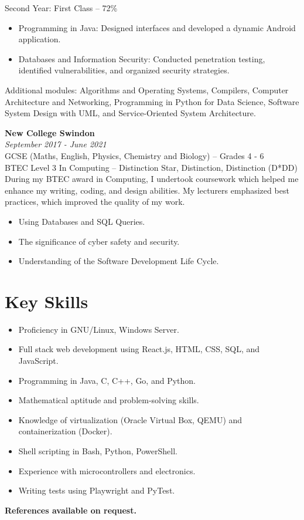 \documentclass[a4paper,12pt]{article}
\begin{document}
Second Year: First Class – 72\% \\
\begin{itemize}[left=0pt,labelsep=5pt]
    \item Programming in Java: Designed interfaces and developed a dynamic Android application.
    \item Databases and Information Security: Conducted penetration testing, identified vulnerabilities, and organized security strategies.
\end{itemize}
Additional modules: Algorithms and Operating Systems, Compilers, Computer Architecture and Networking, Programming in Python for Data Science, Software System Design with UML, and Service-Oriented System Architecture. \\

\vspace{0.3cm}

\textbf{New College Swindon} \\
\textit{September 2017 - June 2021} \\
GCSE (Maths, English, Physics, Chemistry and Biology) – Grades 4 - 6 \\
BTEC Level 3 In Computing – Distinction Star, Distinction, Distinction (D*DD) \\
During my BTEC award in Computing, I undertook coursework which helped me enhance my writing, coding, and design abilities. My lecturers emphasized best practices, which improved the quality of my work.

\begin{itemize}[left=0pt,labelsep=5pt]
    \item Using Databases and SQL Queries.
    \item The significance of cyber safety and security.
    \item Understanding of the Software Development Life Cycle.
\end{itemize}

\vspace{0.5cm}

\section*{Key Skills}
\begin{itemize}[left=0pt,labelsep=5pt]
    \item Proficiency in GNU/Linux, Windows Server.
    \item Full stack web development using React.js, HTML, CSS, SQL, and JavaScript.
    \item Programming in Java, C, C++, Go, and Python.
    \item Mathematical aptitude and problem-solving skills.
    \item Knowledge of virtualization (Oracle Virtual Box, QEMU) and containerization (Docker).
    \item Shell scripting in Bash, Python, PowerShell.
    \item Experience with microcontrollers and electronics.
    \item Writing tests using Playwright and PyTest.
\end{itemize}

\vspace{0.5cm}

\textbf{References available on request.}
\end{document}
